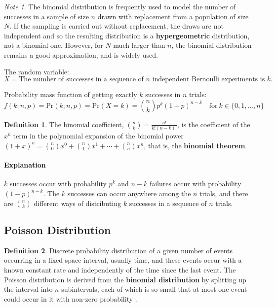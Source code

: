 \documentclass[12pt]{article}
\theoremstyle{plain}
\theoremstyle{definition}
\newtheorem{definition}{Definition}
\theoremstyle{remark}
\newtheorem*{note}{Note}
\begin{document}
\begin{note}
  The binomial distribution is frequently used to model the number of successes
  in a sample of size $n$ drawn with replacement from a population of size
  $N$.
  If the sampling is carried out without replacement, the draws are not
  independent and so the resulting distribution is a \textbf{hypergeometric}
  distribution, not a binomial one. However, for $N$ much larger than $n$, the
  binomial distribution remains a good approximation, and is widely used.
\end{note}

The random variable:
\begin{equation*}
  X = \text{The number of successes in a sequence of $n$ independent Bernoulli
            experiments is $k$.}
\end{equation*}

Probability mass function of getting exactly $k$ successes in $n$ trials:
\begin{equation*}%
  f(k;n,p) = \mathrm{Pr}(k;n,p) = \mathrm{Pr}(X=k) = \binom{n}{k}p^k(1-p)^{n-k}
  \quad \text{for}\ k \in \{0,1,\dots,n\}
\end{equation*}

\begin{definition}
  The binomial coefficient, $\binom{n}{k} = \frac{n!}{k!(n-k)!}$, is the
  coefficient of the $x^k$ term in the polynomial expansion of the binomial
  power
  $(1+x)^n = \binom{n}{0}x^0 + \binom{n}{1}x^1 + \cdots + \binom{n}{n}x^n$,
  that is, the \textbf{binomial theorem}.
\end{definition}

\paragraph{Explanation}
$k$ successes occur with probability $p^k$ and $n-k$ failures occur with
probability $(1-p)^{n-k}$.
The $k$ successes can occur anywhere among the $n$ trials, and there are
$\binom{n}{k}$ different ways of distributing $k$ successes in a sequence of
$n$ trials.

\subsection{Poisson Distribution}

\begin{definition}
  Discrete probability distribution of a given number of events occurring in a
  fixed space interval, usually time, and these events occur with a known
  constant rate and independently of the time since the last event.
  The Poisson distribution is derived from the \textbf{binomial distribution}
  by splitting up the interval into $n$ subintervals, each of which is so small
  that at most one event could occur in it with non-zero probability
  \citep{wacmensch08}.
\end{definition}
\end{document}
